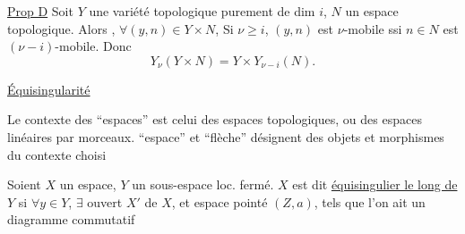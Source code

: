 \uline{Prop D} Soit $Y$  une variété topologique purement de dim $i$, $N$ un espace topologique. Alors , $\forall(y,n)\in Y\times N$,   Si $\nu\geq i$, $(y,n)$  est $\nu$-mobile ssi $n\in N$ est $(\nu-i)$-mobile. Donc
\[
Y_{\nu}(Y\times N)=Y\times Y_{\nu-i}(N).
\]

\uline{Équisingularité}

 Le contexte des ``espaces'' est celui des espaces topologiques, ou des espaces linéaires  par morceaux.   ``espace'' et ``flèche'' désignent des  objets et morphismes du contexte choisi

Soient $X$ un espace, $Y$ un sous-espace loc. fermé. $X$ est dit \uline{équisingulier le long de $Y$} si $\forall y\in Y$, $\exists$ ouvert $X'$ de $X$, et espace pointé $(Z,a)$, tels que l'on ait un diagramme commutatif

